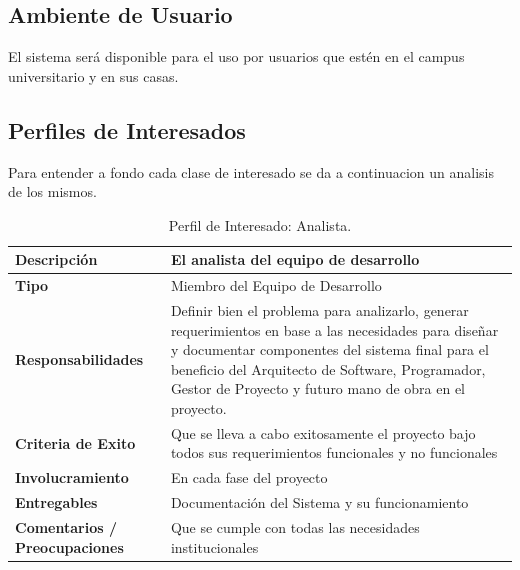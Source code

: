 \subsection{Ambiente de Usuario}
El sistema será disponible para el uso por usuarios que estén en el campus universitario y en sus casas.

\subsection{Perfiles de Interesados}
Para entender a fondo cada clase de interesado se da a continuacion un analisis de los mismos.

\pagebreak

\begin{table}[h!]
  \begin{tabular}{|p{}|p{}|}
    \hline
    \textbf{Descripción} & El analista del equipo de desarrollo \\
    \hline
    \textbf{Tipo} & Miembro del Equipo de Desarrollo \\
    \hline
    \textbf{Responsabilidades} & Definir bien el problema para analizarlo, generar requerimientos en base a las necesidades para diseñar y documentar componentes del sistema final para el beneficio del Arquitecto de Software, Programador, Gestor de Proyecto y futuro mano de obra en el proyecto. \\
    \hline
    \textbf{Criteria de Exito} & Que se lleva a cabo exitosamente el proyecto bajo todos sus requerimientos funcionales y no funcionales \\
    \hline
    \textbf{Involucramiento} & En cada fase del proyecto \\
    \hline
    \textbf{Entregables} & Documentación del Sistema y su funcionamiento \\
    \hline
    \textbf{Comentarios / Preocupaciones} & Que se cumple con todas las necesidades institucionales \\
    \hline
  \end{tabular}
  \caption{Perfil de Interesado: Analista.}
  \label{per-inter-analista}
\end{table}

\vfill

